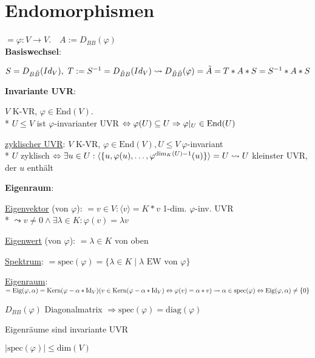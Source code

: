 \section{\label{sec:Endomorphismen}Endomorphismen}

$= \varphi: V \rightarrow V.\quad A:=D_{BB}(\varphi)$
\ \\


\textbf{Basiswechsel}:
\begin{items}
	\item $S=D_{B\tilde{B}}(Id_V), \ T:=S^{-1}=D_{\tilde{B}B}(Id_V) \\* \leadsto D_{\tilde{B}\tilde{B}}(\varphi)=\tilde{A}=T*A*S=S^{-1}*A*S$
\end{items}

\textbf{Invariante UVR}:
\begin{items}
	\item $V$ K-VR, $\varphi \in \text{End}(V)$. \\* $U \leq V$ ist $\varphi$-invarianter UVR $\Leftrightarrow \varphi(U) \subseteq U \\* \Rightarrow \varphi|_U \in \text{End}(U)$
	\item \underline{zyklischer UVR}: $V$ K-VR, $\varphi \in \text{End}(V), U \leq V \ \varphi$-invariant \\* $U$ zyklisch $\Leftrightarrow \exists u \in U: \langle \{ u, \varphi(u),\dots,\varphi^{\text{dim}_K(U)-1}(u) \} \rangle = U \\* \leadsto U$ kleinster UVR, der $u$ enthält
\end{items}

\textbf{Eigenraum}:
\begin{items}
	\item \underline{Eigenvektor} (von $\varphi$): $= v \in V: \langle v \rangle = K * v$ 1-dim. $\varphi$-inv. UVR \\* $\leadsto v \neq 0 \wedge \exists \lambda \in K: \varphi(v)=\lambda v$
	\item \underline{Eigenwert} (von $\varphi$): $= \lambda \in K$ von oben
	\item \underline{Spektrum}: $= \text{spec}(\varphi) = \{ \lambda \in K \mid \lambda \text{ EW von } \varphi \}$
	\item \underline{Eigenraum}: $= \text{Eig}(\varphi, \alpha)= \text{Kern}(\varphi - \alpha * \text{Id}_V) \\* (v \in \text{Kern}(\varphi - \alpha * \text{Id}_V) \Leftrightarrow \varphi(v) = \alpha*v) \\* \leadsto \alpha \in \text{spec}(\varphi) \Leftrightarrow \text{Eig}(\varphi, \alpha) \neq \{ 0 \}$
	\item $D_{BB}(\varphi)$ Diagonalmatrix $\Rightarrow \text{spec}(\varphi) = \text{diag}(\varphi)$
	\item Eigenräume sind invariante UVR
	\item $| \text{spec}(\varphi) | \leq \text{dim}(V)$
\end{items}


